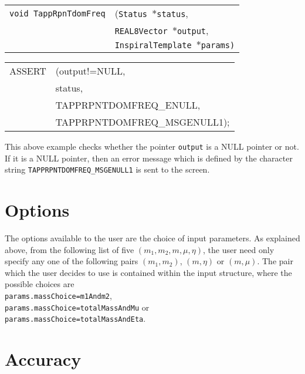\documentclass[12pt]{article}
\begin{document}
\begin{tabular}{ll}
\texttt{void TappRpnTdomFreq} & (\texttt{Status $\ast$status}, \\
                        & \texttt{REAL8Vector $\ast$output}, \\
                        & \texttt{InspiralTemplate $\ast$params)}
\end{tabular}

\vspace{5mm}

\begin{tabular}{ll}
ASSERT & (output!=NULL,  \\
    &  status,    \\
    &  TAPPRPNTDOMFREQ\_ENULL, \\
    &  TAPPRPNTDOMFREQ\_MSGENULL1);
\end{tabular}

\vspace{5mm}

This above example checks whether the pointer \texttt{output} is a NULL pointer or not. If it is a NULL pointer, then an error message which is defined by the character string \texttt{TAPPRPNTDOMFREQ\_MSGENULL1} is sent to the screen. 


\section{Options}

The options available to the user are the choice of input parameters. As explained above, from the following list of five $(m_{1},m_{2},m,\mu,\eta)$, the user need only specify any one of the following pairs $(m_{1},m_{2})$, $(m,\eta)$ or $(m,\mu)$. The pair which the user decides to use is contained within the input structure, where the possible choices are \\ \texttt{params.massChoice=m1Andm2}, \\ \texttt{params.massChoice=totalMassAndMu} or \\ \texttt{params.massChoice=totalMassAndEta}.


\section{Accuracy}
\end{document}
